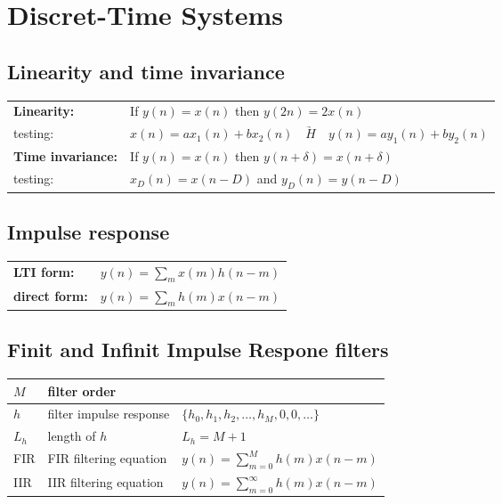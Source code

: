 \section{Discret-Time Systems}
\subsection{Linearity and time invariance}
\begin{tabular}{ll}
\textbf{Linearity:} & If $y(n) = x(n)$ then $y(2n)=2x(n)$\\
testing: & $x(n) = ax_1(n) + bx_2(n) \quad \underrightarrow{H} \quad y(n) = ay_1(n) + by_2(n)$\\
\textbf{Time invariance:} & If $y(n) = x(n)$ then $y(n+\delta) = x(n+\delta)$\\
testing: & $x_D(n)=x(n-D)$ and $y_D(n)=y(n-D)$\\
\end{tabular}

\subsection{Impulse response}
\begin{tabular}{ll}
	\textbf{LTI form:}		& $y(n) = \sum\limits_m x(m)h(n-m)$ \\
	\textbf{direct form:}	& $y(n) = \sum\limits_m h(m)x(n-m)$
\end{tabular}


\subsection{Finit and Infinit Impulse Respone filters}
\begin{tabularx}{0.75\textwidth}{|l|X|X|}
	\hline
	$M$	& filter order				& 
	\\ \hline
	$h$	& filter impulse response	& $\{ h_0, h_1, h_2, \ldots , h_M, 0, 0, \ldots\}$
	\\ \hline
	$L_h$	& length of $h$			& $L_h = M + 1$
	\\ \hline
	FIR		& FIR filtering equation	& $y(n) = \sum\limits_{m=0}^{M} h(m)x(n-m)$
	\\ \hline
	IIR		& IIR filtering equation	& $y(n) = \sum\limits_{m=0}^{\infty} h(m)x(n-m)$
	\\ \hline
\end{tabularx}

